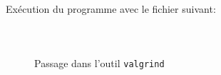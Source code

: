 Exécution du programme avec le fichier suivant:
\inputminted[frame=single,label=Test]{text}{../tests/test}

\inputminted[frame=single,label=Resultat]{text}{../tests/resultat_test}

\newpage
\begin{figure}[H]
  \inputminted[frame=single,label=Resultat Valgrind]{text}{../tests/valgrind_test}
  \caption{Passage dans l'outil \texttt{valgrind}}
\end{figure}
